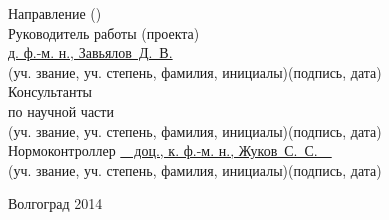 \begin{titlepage}
\begin{flushleft}
	Направление ()\\
	Руководитель работы (проекта)\\
	\underline{д. ф.-м. н., Завьялов~Д.~В.}\hfill\underline{\hspace{5cm}}\\
	\vspace{-.2cm}\hspace{.4cm}\footnotesize(уч. звание, уч. степень, фамилия, 
		инициалы)\hspace{6.5cm}(подпись, дата)\normalsize\\
	Консультанты\\
	по научной части \underline{\hspace{7cm}}\hfill\underline{\hspace{5cm}}\\
	\vspace{-.2cm}\hspace{4cm}\footnotesize(уч. звание, уч. степень, фамилия, 
		инициалы)\hspace{3cm}(подпись, дата)\normalsize\\
	Нормоконтроллер \underline{\ \ доц., к. ф.-м. н., Жуков~С.~С.\ \ }\hfill
		\underline{\hspace{5cm}}\\
	\vspace{-.2cm}\hspace{4cm}\footnotesize(уч. звание, уч. степень, фамилия, 
		инициалы)\hspace{3cm}(подпись, дата)\normalsize\\
\end{flushleft}
\vspace{\fill}
\begin{center}
	Волгоград 2014
\end{center}
\end{titlepage}

